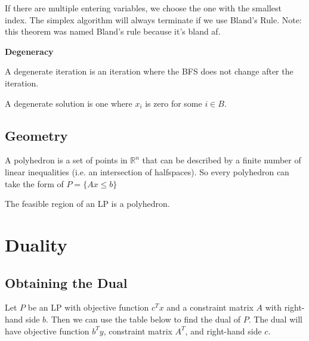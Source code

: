 \documentclass[a4paper]{report}
\begin{document}
	\begin{theorem}
		If there are multiple entering variables, we choose the one with the
		smallest index. The simplex algorithm will always terminate if we use Bland's
		Rule. Note: this theorem was named Bland's rule because it's bland af.
	\end{theorem}

	\begin{definition*}
		\textbf{Degeneracy} \item
		\begin{definition}
			\label{degeneracy:i} A degenerate iteration is an iteration where the BFS does
			not change after the iteration.
		\end{definition}

		\item
		\begin{definition}
			\label{degeneracy:ii} A degenerate solution is one where $x_{i}$ is zero for
			some $i \in B$.
		\end{definition}
	\end{definition*}

	\section{Geometry}
	\begin{definition}[Polyhedron]
		A polyhedron is a set of points in $\mathbb{R}^{n}$ that can be described by
		a finite number of linear inequalities (i.e. an intersection of halfspaces).
		So every polyhedron can take the form of $P = \{Ax \leq b\}$
	\end{definition}

	\begin{remark}
		The feasible region of an LP is a polyhedron.
	\end{remark}

	\chapter{Duality}

	\section{Obtaining the Dual}
	\begin{definition}[Dual of an LP]
		\label{dual} Let $P$ be an LP with objective function $c^{T}x$ and a constraint
		matrix $A$ with right-hand side $b$. Then we can use the table below to find
		the dual of $P$. The dual will have objective function $b^{T} y$, constraint
		matrix $A^{T}$, and right-hand side $c$.
	\end{definition}
\end{document}
